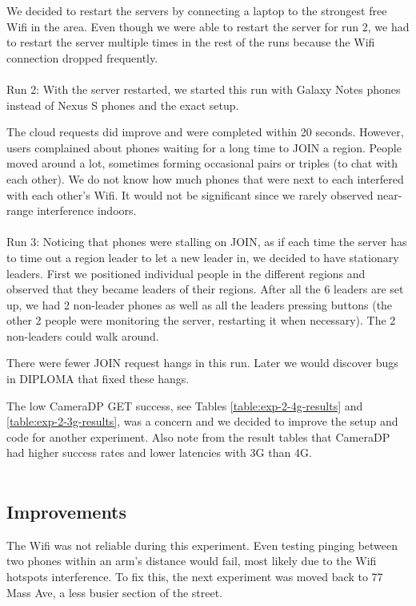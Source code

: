 We decided to restart the servers by connecting a laptop to the strongest free Wifi in the area. Even though we were able to restart the server for run 2, we had to restart the server multiple times in the rest of the runs because the Wifi connection dropped frequently.
\\
\\
Run 2:
With the server restarted, we started this run with Galaxy Notes phones instead of Nexus S phones and the exact setup.

The cloud requests did improve and were completed within 20 seconds. However, users complained about phones waiting for a long time to JOIN a region.  People moved around a lot, sometimes forming occasional pairs or triples (to chat with each other). We do not know how much phones that were next to each interfered with each other's Wifi. It would not be significant since we rarely observed near-range interference indoors. 
\\
\\
Run 3:
Noticing that phones were stalling on JOIN, as if each time the server has to time out a region leader to let a new leader in, we decided to have stationary leaders. First we positioned individual people in the different regions and observed that they became leaders of their regions. After all the 6 leaders are set up, we had 2 non-leader phones as well as all the leaders pressing buttons (the other 2 people were monitoring the server, restarting it when necessary). The 2 non-leaders could walk around. 

There were fewer JOIN request hangs in this run. Later we would discover bugs in DIPLOMA that fixed these hangs.

The low CameraDP GET success, see Tables \ref{table:exp-2-4g-results} and \ref{table:exp-2-3g-results}, was a concern and we decided to improve the setup and code for another experiment. Also note from the result tables that CameraDP had higher success rates and lower latencies with 3G than 4G.
\\
\\
\subsection{Improvements}
The Wifi was not reliable during this experiment. Even testing pinging between two phones within an arm's distance would fail, most likely due to the Wifi hotspots interference. To fix this, the next experiment was moved back to 77 Mass Ave, a less busier section of the street.

